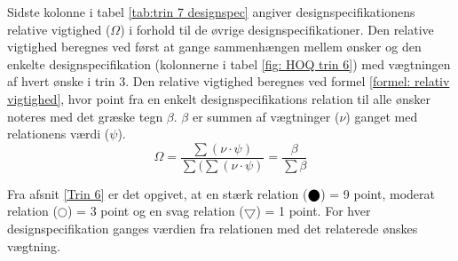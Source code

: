 Sidste kolonne i tabel \ref{tab:trin 7 designspec} angiver designspecifikationens relative vigtighed ($\Omega$) i forhold til de øvrige designspecifikationer. Den relative vigtighed beregnes ved først at gange sammenhængen mellem ønsker og den enkelte designspecifikation (kolonnerne i tabel \ref{fig: HOQ trin 6}) med vægtningen af hvert ønske i trin 3. Den relative vigtighed beregnes ved formel \ref{formel: relativ vigtighed}, hvor point fra en enkelt designspecifikations relation til alle ønsker noteres med det græske tegn $\beta$. $\beta$ er summen af vægtninger ($\nu$) ganget med relationens værdi ($\psi$).
\begin{equation} \label{formel: relativ vigtighed}
    \Omega = \frac{\sum(\nu\cdot \psi)}{\sum(\sum(\nu\cdot \psi)} = \frac{\beta}{\sum\beta}
\end{equation}

Fra afsnit \ref{Trin 6} er det opgivet, at en stærk relation ($\blackbigcirc$) = 9 point, moderat relation ($\bigcirc$) = 3 point og en svag relation ($\bigtriangledown$) = 1 point. For hver designspecifikation ganges værdien fra relationen med det relaterede ønskes vægtning. 



